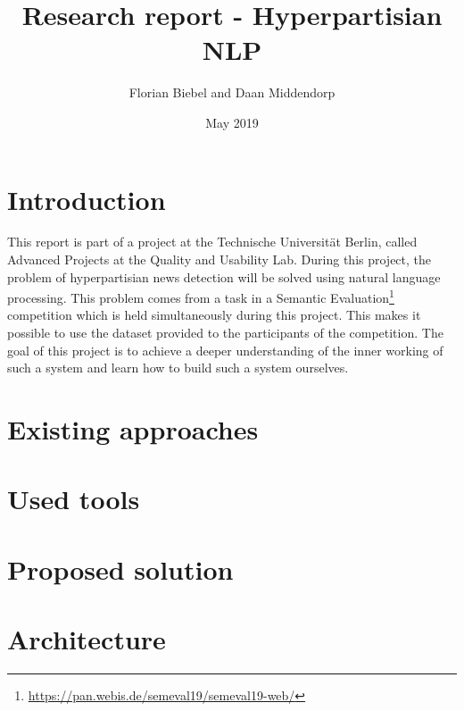 \documentclass{article}
\title{Research report - Hyperpartisian NLP}
\author{Florian Biebel and Daan Middendorp}
\date{May 2019}
\begin{document}
\maketitle

\section{Introduction}
This report is part of a project at the Technische Universität Berlin, called Advanced Projects at the Quality and Usability Lab. During this project, the problem of hyperpartisian news detection will be solved using natural language processing. This problem comes from a task in a Semantic Evaluation\footnote{\url{https://pan.webis.de/semeval19/semeval19-web/}} competition which is held simultaneously during this project. This makes it possible to use the dataset provided to the participants of the competition. The goal of this project is to achieve a deeper understanding of the inner working of such a system and learn how to build such a system ourselves.
\section{Existing approaches}
\section{Used tools}
\section{Proposed solution}
\section{Architecture}
\end{document}
